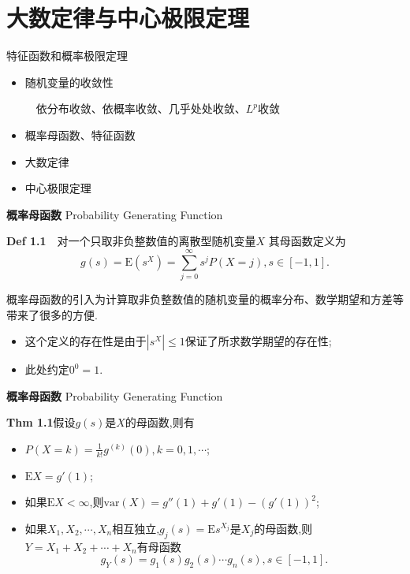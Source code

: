 \section{大数定律与中心极限定理}
    
    \frame{\sectionpage}
    
     \begin{frame}{特征函数和概率极限定理}
    \begin{itemize}
    	\item 随机变量的收敛性
    	
    	$\quad$依分布收敛、依概率收敛、几乎处处收敛、$L^p$收敛
    	\item 概率母函数、特征函数
    	\item 大数定律
    	\item 中心极限定理
    \end{itemize}
\end{frame}

\begin{frame}{\textbf{概率母函数} Probability Generating Function}
		\begin{block}{\textbf{Def 1.1}$\quad$对一个只取非负整数值的离散型随机变量$X$}
		其母函数定义为\begin{equation}
			g(s) = \mathrm{E}(s^X) = \sum_{j=0}^\infty s^jP(X=j),s\in [-1,1].
		\end{equation}
	\end{block}
	概率母函数的引入为计算取非负整数值的随机变量的概率分布、数学期望和方差等带来了很多的方便.
	\begin{itemize}
		\item 这个定义的存在性是由于$|s^X|\leqslant 1$保证了所求数学期望的存在性;
		\item 此处约定$0^0 = 1$.
	\end{itemize}

\end{frame}

\begin{frame}{\textbf{概率母函数} Probability Generating Function}
\begin{block}{\textbf{Thm 1.1}假设$g(s)$是$X$的母函数,则有}
	\begin{itemize}
		\item $P(X=k) = \frac{1}{k!}g^{(k)}(0),k=0,1,\cdots$;
		\item $\mathrm{E}X = g'(1)$;
		\item 如果$\mathrm{E}X<\infty$,则$\mathrm{var}(X) = g''(1)+g'(1)-(g'(1))^2$;
		\item 如果$X_1,X_2,\cdots,X_n$相互独立,$g_j(s) = \mathrm{E}s^{X_j}$是$X_j$的母函数,则$Y = X_1+X_2+\cdots+X_n$有母函数
		\begin{equation}
			g_Y(s) = g_1(s)g_2(s)\cdots g_n(s),s\in [-1,1].
		\end{equation}
	\end{itemize}	
\end{block}
\end{frame}

